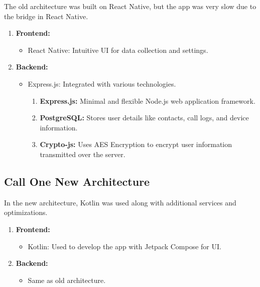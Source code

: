 The old architecture was built on React Native, but the app was very slow due to the bridge in React Native.
\begin{enumerate}[label=\roman*.]
    \item \textbf{Frontend:}
    \begin{itemize}
        \item React Native: Intuitive UI for data collection and settings.
    \end{itemize}

    \item \textbf{Backend:}
    \begin{itemize}
        \item Express.js: Integrated with various technologies.
        \begin{enumerate}[label=\arabic*.]
            \item \textbf{Express.js:} Minimal and flexible Node.js web application framework.
            \item \textbf{PostgreSQL:} Stores user details like contacts, call logs, and device information.
            \item \textbf{Crypto-js:} Uses AES Encryption to encrypt user information transmitted over the server.
        \end{enumerate}
    \end{itemize}
\end{enumerate}

\subsection{Call One New Architecture}\label{subsec:new-architecture}
In the new architecture, Kotlin was used along with additional services and optimizations.
\begin{enumerate}[label=\roman*.]
    \item \textbf{Frontend:}
    \begin{itemize}
        \item Kotlin: Used to develop the app with Jetpack Compose for UI.
    \end{itemize}

    \item \textbf{Backend:}
    \begin{itemize}
        \item Same as old architecture.
    \end{itemize}
\end{enumerate}


